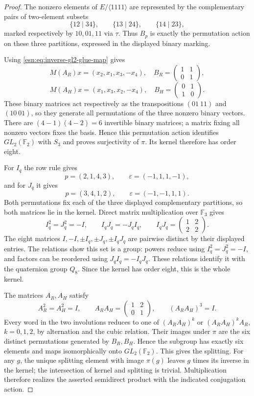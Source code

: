 \begin{proof}
The nonzero elements of \(E/\langle1111\rangle\) are represented by
the complementary pairs of two-element subsets
\[
 \{12\mid34\},\qquad\{13\mid24\},\qquad\{14\mid23\},
\]
marked respectively by \(10,01,11\) via \(\tau\).
Thus \(B_p\) is exactly the permutation action on these three
partitions, expressed in the displayed binary marking.

Using \eqref{esn:eq:inverse-gl2-glue-map} gives
\[
 M(A_R)x=(x_2,x_1,x_3,-x_4),\quad
 B_R=\begin{pmatrix}1&1\\0&1\end{pmatrix},
\]
\[
 M(A_H)x=(x_1,x_3,x_2,-x_4),\quad
 B_H=\begin{pmatrix}0&1\\1&0\end{pmatrix}.
\]
These binary matrices act respectively as the transpositions
\((01\ 11)\) and \((10\ 01)\), so they generate all permutations of
the three nonzero binary vectors.  There are
\((4-1)(4-2)=6\) invertible binary matrices; a matrix fixing all nonzero
vectors fixes the basis.  Hence this permutation action identifies
\(GL_2(\mathbb F_2)\) with \(S_3\) and proves surjectivity of \(\pi\).
Its kernel therefore has order eight.

For \(I_q\) the row rule gives
\[
 p=(2,1,4,3),\qquad\varepsilon=(-1,1,1,-1),
\]
and for \(J_q\) it gives
\[
 p=(3,4,1,2),\qquad\varepsilon=(-1,-1,1,1).
\]
Both permutations fix each of the three displayed complementary
partitions, so both matrices lie in the kernel.  Direct matrix
multiplication over \(\mathbb F_3\) gives
\[
 I_q^2=J_q^2=-I,\qquad I_qJ_q=-J_qI_q,
 \qquad I_qJ_q=\begin{pmatrix}1&2\\2&2\end{pmatrix}.
\]
The eight matrices
\(I,-I,\pm I_q,\pm J_q,\pm I_qJ_q\) are pairwise distinct by their
displayed entries.  The relations show this set is a group: powers reduce
using \(I_q^2=J_q^2=-I\), and factors can be reordered using
\(J_qI_q=-I_qJ_q\).  These relations identify it with the quaternion
group \(Q_8\).  Since the kernel has order eight, this is the whole kernel.

The matrices \(A_R,A_H\) satisfy
\[
 A_R^2=A_H^2=I,\qquad
 A_RA_H=\begin{pmatrix}1&2\\0&1\end{pmatrix},\qquad
 (A_RA_H)^3=I.
\]
Every word in the two involutions reduces to one of
\((A_RA_H)^k\) or \((A_RA_H)^kA_R\), \(k=0,1,2\), by alternation
and the cubic relation.  Their images under \(\pi\) are the six distinct
permutations generated by \(B_R,B_H\).  Hence the subgroup has exactly
six elements and maps isomorphically onto \(GL_2(\mathbb F_2)\).
This gives the splitting.  For any \(g\), the unique splitting element
with image \(\pi(g)\) leaves \(g\) times its inverse in the kernel;
the intersection of kernel and splitting is trivial.  Multiplication
therefore realizes the asserted semidirect product with the indicated
conjugation action.
\end{proof}

